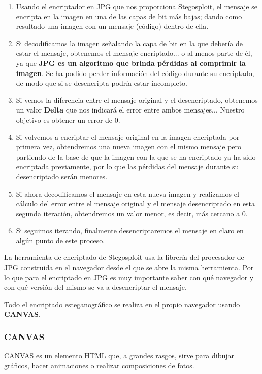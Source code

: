\begin{enumerate}
\item Usando el encriptador en JPG que nos proporciona Stegosploit, el mensaje se encripta en la imagen en una de las capas de bit más bajas; dando como resultado una imagen con un mensaje (código) dentro de ella.
\item Si decodificamos la imagen señalando la capa de bit en la que debería de estar el mensaje, obtenemos el mensaje encriptado... o al menos parte de él, ya que \textbf{JPG es un algoritmo que brinda pérdidas al comprimir la imagen}. Se ha podido perder información del código durante su encriptado, de modo que si se desencripta podría estar incompleto.
\item Si vemos la diferencia entre el mensaje original y el desencriptado, obtenemos un valor \textbf{Delta} que nos indicará el error entre ambos mensajes... Nuestro objetivo es obtener un error de 0.
\item Si volvemos a encriptar el mensaje original en la imagen encriptada por primera vez, obtendremos una nueva imagen con el mismo mensaje pero partiendo de la base de que la imagen con la que se ha encriptado ya ha sido encriptada previamente, por lo que las pérdidas del mensaje durante su desencriptado serán menores.
\item Si ahora decodificamos el mensaje en esta nueva imagen y realizamos el cálculo del error entre el mensaje original y el mensaje desencriptado en esta segunda iteración, obtendremos un valor menor, es decir, más cercano a 0.
\item Si seguimos iterando, finalmente desencriptaremos el mensaje en claro en algún punto de este proceso.
\end{enumerate}

La herramienta de encriptado de Stegosploit usa la librería del procesador de JPG construida en el navegador desde el que se abre la misma herramienta. Por lo que para el encriptado en JPG es muy importante saber con qué navegador y con qué versión del mismo se va a desencriptar el mensaje.

Todo el encriptado esteganográfico se realiza en el propio navegador usando \textbf{CANVAS}. %

\subsubsection{CANVAS}

CANVAS es un elemento HTML que, a grandes rasgos, sirve para dibujar gráficos, hacer animaciones o realizar composiciones de fotos. %

